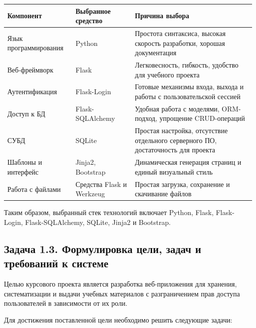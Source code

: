 \documentclass[14pt,a4paper]{extarticle}
\begin{document}
\begin{center}
\footnotesize\begin{tabularx}{0.96\textwidth}{>{\raggedright\arraybackslash}p{4.1cm} >{\raggedright\arraybackslash}p{3.1cm} >{\raggedright\arraybackslash}X}
\toprule
\textbf{Компонент} & \textbf{Выбранное средство} & \textbf{Причина выбора} \\
\midrule
Язык программирования & Python & Простота синтаксиса, высокая скорость разработки, хорошая документация \\
Веб-фреймворк & Flask & Легковесность, гибкость, удобство для учебного проекта \\
Аутентификация & Flask-Login & Готовые механизмы входа, выхода и работы с пользовательской сессией \\
Доступ к БД & Flask-SQLAlchemy & Удобная работа с моделями, ORM-подход, упрощение CRUD-операций \\
СУБД & SQLite & Простая настройка, отсутствие отдельного серверного ПО, достаточность для проекта \\
Шаблоны и интерфейс & Jinja2, Bootstrap & Динамическая генерация страниц и единый визуальный стиль \\
Работа с файлами & Средства Flask и Werkzeug & Простая загрузка, сохранение и скачивание файлов \\
\bottomrule
\end{tabularx}
\end{center}

Таким образом, выбранный стек технологий включает Python, Flask, Flask-Login, Flask-SQLAlchemy, SQLite, Jinja2 и Bootstrap.

\subsection{Задача 1.3. Формулировка цели, задач и требований к системе}

Целью курсового проекта является разработка веб-приложения для хранения, систематизации и выдачи учебных материалов с разграничением прав доступа пользователей в зависимости от их роли.

Для достижения поставленной цели необходимо решить следующие задачи:
\end{document}
